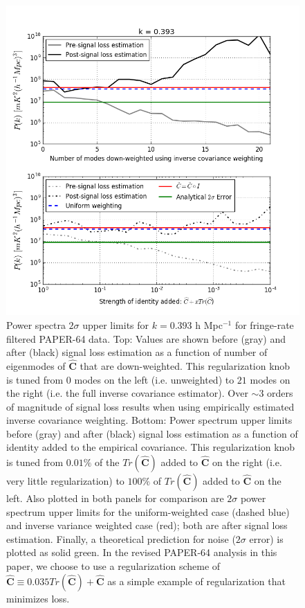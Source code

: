 \documentclass[preprint2,numberedappendix,tighten]{aastex6}  %
\begin{document}
\begin{figure}
	\centering
	\includegraphics[width=1\textwidth]{plots/sigloss_modeloop_2panel.png}
	\caption{Power spectra $2\sigma$ upper limits for $k=0.393$ h Mpc$^{-1}$ for fringe-rate filtered PAPER-64 data. Top: Values 
are shown before (gray) and after (black) signal loss estimation as a function of number of eigenmodes of $\widehat{\textbf{C}}$ that 
are down-weighted. This regularization knob is tuned from $0$ modes on the left (i.e. unweighted) to $21$ modes on the right (i.e. the full inverse 
covariance estimator). Over $\sim3$ orders of magnitude of signal loss results when using empirically estimated inverse covariance weighting. Bottom: Power spectrum upper limits before (gray) and after (black) signal loss estimation as a function of identity added to the empirical covariance. This regularization knob is tuned from $0.01\%$  of the $Tr(\widehat{\textbf{C}})$ added to $\widehat{\textbf{C}}$ on the right (i.e. very little regularization) to $100\%$ of $Tr(\widehat{\textbf{C}})$ added to $\widehat{\textbf{C}}$ on the left. Also 
plotted in both panels for comparison are $2\sigma$ power spectrum upper limits for the uniform-weighted case (dashed blue) and inverse variance 
weighted case (red); both are after signal loss estimation. Finally, a theoretical prediction for noise ($2\sigma$ error) is plotted 
as solid green. In the revised PAPER-64 analysis in this paper, we choose to use a regularization scheme of $\widehat{\textbf{C}} \equiv 0.035Tr(\widehat{\textbf{C}}) + \widehat{\textbf{C}}$ as a simple example of regularization that minimizes loss.}
	\label{fig:sigloss_modeloop}
\end{figure}
\end{document}
